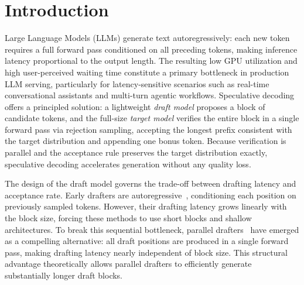 \section{Introduction}
\label{sec:intro}

Large Language Models (LLMs) generate text autoregressively: each new token requires a full forward pass conditioned on all preceding tokens, making inference latency proportional to the output length.
The resulting low GPU utilization and high user-perceived waiting time constitute a primary bottleneck in production LLM serving, particularly for latency-sensitive scenarios such as real-time conversational assistants and multi-turn agentic workflows.
Speculative decoding~\citep{pmlr-v202-leviathan23a,chen2023accelerating} offers a principled solution: a lightweight \textit{draft model} proposes a block of candidate tokens, and the full-size \textit{target model} verifies the entire block in a single forward pass via rejection sampling, accepting the longest prefix consistent with the target distribution and appending one bonus token.
Because verification is parallel and the acceptance rule preserves the target distribution exactly, speculative decoding accelerates generation without any quality loss.

The design of the draft model governs the trade-off between drafting latency and acceptance rate. Early drafters are autoregressive~\citep{li-etal-2024-eagle,cheng2024recurrentdrafterfastspeculative}, conditioning each position on previously sampled tokens. However, their drafting latency grows linearly with the block size, forcing these methods to use short blocks and shallow architectures. To break this sequential bottleneck, parallel drafters~\citep{pmlr-v235-cai24b,liu2026dartdiffusioninspiredspeculativedecoding,chen2026dflash} have emerged as a compelling alternative: all draft positions are produced in a single forward pass, making drafting latency nearly independent of block size. This structural advantage theoretically allows parallel drafters to efficiently generate substantially longer draft blocks.

